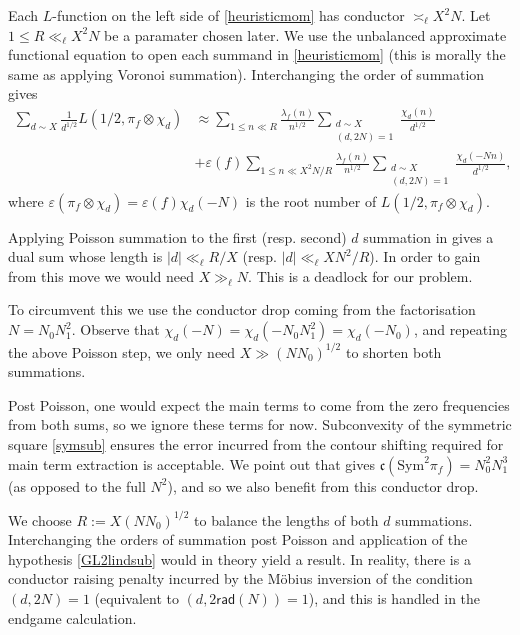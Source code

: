 \documentclass[12pt,reqno]{amsart}
\theoremstyle{plain}
\theoremstyle{remark}
\numberwithin{equation}{section}
\numberwithin{lemma}{section}
\numberwithin{theorem}{section}
\numberwithin{prop}{section}
\numberwithin{remark}{section}
\begin{document}
Each $L$-function on the left side of \eqref{heuristicmom}
has conductor $\asymp_{\ell} X^2 N$. Let
$1 \leq R \ll_{\ell} X^2 N$ be a paramater chosen later.
We use the unbalanced approximate functional equation \cite[Theorem~5.3]{IK}
to open each summand in \eqref{heuristicmom} (this is morally the same as applying Voronoi summation).
Interchanging the order of summation gives
\begin{align} \label{coreexp}
\sum_{d \sim X } \frac{1}{d^{1/2}} L(1/2,\pi_f \otimes \chi_d) & \approx 
\sum_{1 \leq n \ll R} \frac{\lambda_f(n)}{n^{1/2}} 
\sum_{\substack{d \sim X \\ (d,2N)=1 }} \frac{\chi_d(n)}{d^{1/2}}  \nonumber \\
&+ \varepsilon(f) \sum_{1 \leq n \ll X^2 N/R} \frac{\lambda_f(n)}{n^{1/2}} 
\sum_{\substack{d \sim X \\ (d,2N)=1}} \frac{\chi_d(-Nn)}{d^{1/2}}, 
\end{align}
where $\varepsilon(\pi_f \otimes \chi_d)=\varepsilon(f) \chi_d(-N)$
is the root number of  $L(1/2,\pi_f \otimes \chi_d)$.

Applying Poisson summation
to the first (resp. second) $d$ summation in  gives a dual sum
whose length is $|d| \ll_{\ell} R/X$ (resp. $|d| \ll_{\ell} XN^2/ R$). In order to gain from this move 
we would need $X \gg_{\ell} N$. 
This is a deadlock for our problem.

To circumvent this we use the conductor drop coming from the factorisation
 $N=N_0 N_1^2$. Observe that $\chi_d(-N)=\chi_d(-N_0 N_1^2)=\chi_d(-N_0)$,
 and repeating the above Poisson step, we only need $X \gg (N N_0)^{1/2}$
 to shorten both summations. 
 
 Post Poisson, one would expect the main terms to come from the zero frequencies 
 from both sums, so we ignore these terms for now. 
 Subconvexity of the symmetric square \eqref{symsub} ensures the error incurred 
 from the contour shifting required for main term extraction is acceptable. We point 
 out that \cite[Example~1]{Li2} gives $\mathfrak{c}(\text{Sym}^2 \pi_f)=N_0^2 N_1^3$ (as opposed
 to the full $N^2$), and
 so we also benefit from this conductor drop.

 We choose $R:=X(NN_0)^{1/2}$ to balance the lengths of both $d$ summations. 
Interchanging the orders of summation post Poisson 
and application of the hypothesis \eqref{GL2lindsub} would in 
theory yield a result. In reality, there is a conductor raising penalty incurred
by the M\"{o}bius 
inversion of the condition $(d,2N)=1$ (equivalent to $(d,2 \mathsf{rad}(N))=1$),
and this is handled in the endgame calculation.
 
\end{document}
